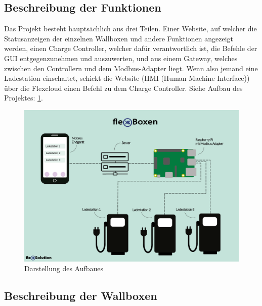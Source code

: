 \subsection{Beschreibung der Funktionen}
Das Projekt besteht hauptsächlich aus drei Teilen.
Einer Website, auf welcher die Statusanzeigen der 
einzelnen Wallboxen und andere Funktionen angezeigt
werden, einen Charge Controller, welcher dafür 
verantwortlich ist, die Befehle der GUI entgegenzunehmen 
und auszuwerten, und aus einem Gateway, welches zwischen 
den Controllern und dem Modbus-Adapter liegt. Wenn also 
jemand eine Ladestation einschaltet, schickt die Website 
(HMI (Human Machine Interface)) über die Flexcloud einen 
Befehl zu dem Charge Controller. 
Siehe Aufbau des Projektes: \ref{fig:impl:Infografik_FlexBoxen}.

  \begin{figure}
    \centering
    \includegraphics[scale=0.5]{pics/Infografik_FlexBoxen.png}
    \caption{Darstellung des Aufbaues}
    \label{fig:impl:Infografik_FlexBoxen}
\end{figure}





\subsection{Beschreibung der Wallboxen}

